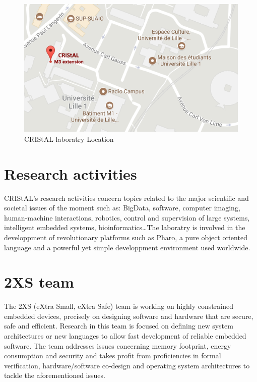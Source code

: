 \begin{figure}[!ht]
	\centering
	\includegraphics[scale=0.4 , frame]{img/cristalLocation.png} 
	\caption{CRIStAL laboratry Location}
\end{figure}


\section{Research activities}

CRIStAL's research activities concern topics related to the major scientific and societal issues of the moment such as: BigData, software, computer imaging, human-machine interactions, robotics, control and supervision of large systems, intelligent embedded systems, bioinformatics\dots The laboratry is involved in the developpment of revolutionary platforms such as Pharo, a pure object oriented language and a powerful yet simple developpment environment used worldwide.

\section{2XS team}

The 2XS (eXtra Small, eXtra Safe) team is working on highly constrained embedded devices, precisely on designing software and hardware that are secure, safe and efficient. Research in this team is focused on defining new system architectures or new languages to allow fast development of reliable embedded software. The team addresses issues concerning memory footprint, energy consumption and security and takes profit from proficiencies in formal verification, hardware/software co-design and operating system architectures to tackle the aforementioned issues.\\

